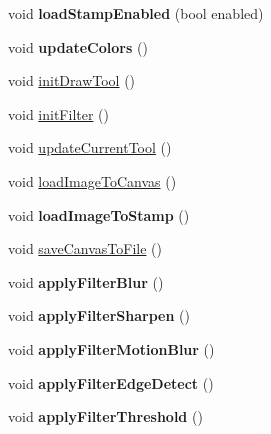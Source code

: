 \begin{DoxyCompactItemize}
\item 
void {\bfseries load\+Stamp\+Enabled} (bool enabled)\hypertarget{classFlashPhotoApp_a9e58a2c36d94fcbe376f3cb5b75ad5e0}{}\label{classFlashPhotoApp_a9e58a2c36d94fcbe376f3cb5b75ad5e0}

\item 
void {\bfseries update\+Colors} ()\hypertarget{classFlashPhotoApp_ad554624b8359abe270e5c6e76634ff48}{}\label{classFlashPhotoApp_ad554624b8359abe270e5c6e76634ff48}

\item 
void \hyperlink{classFlashPhotoApp_a29383606562f09ba623209581f92f5e5}{init\+Draw\+Tool} ()
\item 
void \hyperlink{classFlashPhotoApp_aeaf85d6ead6ca4b3905701db12ceaf68}{init\+Filter} ()
\item 
void \hyperlink{classFlashPhotoApp_a52eb2524a928df150d75492d96a3d49c}{update\+Current\+Tool} ()
\item 
void \hyperlink{classFlashPhotoApp_a7cc9f1383c18cb7eebc255d3c377adb0}{load\+Image\+To\+Canvas} ()
\item 
void {\bfseries load\+Image\+To\+Stamp} ()\hypertarget{classFlashPhotoApp_a87aee2ef5baef954b682c67e3d5118da}{}\label{classFlashPhotoApp_a87aee2ef5baef954b682c67e3d5118da}

\item 
void \hyperlink{classFlashPhotoApp_ab0389fb3c2c64e0e3312880e745b7070}{save\+Canvas\+To\+File} ()
\item 
void {\bfseries apply\+Filter\+Blur} ()\hypertarget{classFlashPhotoApp_a16ff3baa9c0d97d8e4f292acb4ebbfac}{}\label{classFlashPhotoApp_a16ff3baa9c0d97d8e4f292acb4ebbfac}

\item 
void {\bfseries apply\+Filter\+Sharpen} ()\hypertarget{classFlashPhotoApp_a9d45a9f24245024cba2c9090d7acb528}{}\label{classFlashPhotoApp_a9d45a9f24245024cba2c9090d7acb528}

\item 
void {\bfseries apply\+Filter\+Motion\+Blur} ()\hypertarget{classFlashPhotoApp_af99c135d287d07e01ccd1637cba0d347}{}\label{classFlashPhotoApp_af99c135d287d07e01ccd1637cba0d347}

\item 
void {\bfseries apply\+Filter\+Edge\+Detect} ()\hypertarget{classFlashPhotoApp_ae7360d5fc26c2789d0126defb1c30e9f}{}\label{classFlashPhotoApp_ae7360d5fc26c2789d0126defb1c30e9f}

\item 
void {\bfseries apply\+Filter\+Threshold} ()\hypertarget{classFlashPhotoApp_a316479ee5fc48b785c266953147de63e}{}\label{classFlashPhotoApp_a316479ee5fc48b785c266953147de63e}


\end{DoxyCompactItemize}
